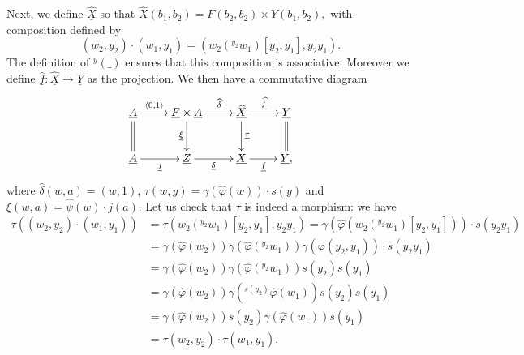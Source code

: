 \documentclass[11pt]{amsart}
\theoremstyle{plain}
\theoremstyle{definition}
\theoremstyle{remark}
\newcommand{\un}{\underline}
\begin{document}
Next, we define $\un{\widehat{X}}$ so that $\widehat{X}(b_1,b_2)=F(b_2, b_2) \times Y(b_1,b_2),$ with composition defined by
\[(w_2,y_2)\cdot (w_1,y_1) = (w_2({}^{y_2} w_1)[y_2,y_1] , y_2y_1). \]
The definition of ${}^y (\_ )$ ensures that this composition is associative. Moreover we define $\un{\widehat{f}}\colon \un{\widehat{X}} \to \un{Y}$ as the projection. We then have a commutative diagram
\begin{equation} \label{first part zigzag}
\xymatrix{ \un{A} \ar@{=}[d] \ar[r]^-{\langle 0, 1 \rangle} & \un{F} \times \un{A} \ar[d]_{\un{\xi}} \ar[r]^-{\un{\widehat{\delta}}} & \un{\widehat{X}} \ar[d]^{\un{\tau}} \ar[r]^{\un{\widehat{f}}} & \un{Y} \ar@{=}[d] \\
{\un{A}} \ar[r]_{\un{j}} &{\un{Z}} \ar[r]_-{\un{\delta}} &{\un{X}} \ar[r]_-{\un{f}} &{\un{Y},} }
\end{equation}
where $\widehat{\delta}(w,a) = (w,1)$, $\tau(w,y) = \gamma(\widehat{\varphi}(w))\cdot s(y)$ and $\xi (w,a) = \widehat{\psi}(w)\cdot j(a)$. Let us check that $\un{\tau}$ is indeed a morphism: we have
\begin{align*}
	\tau((w_2,y_2)\cdot (w_1,y_1)) & = \tau(w_2({}^{y_2} w_1)[y_2,y_1] , y_2y_1) = \gamma(\widehat{\varphi} (w_2({}^{y_2} w_1)[y_2,y_1]))\cdot s(y_2y_1)\\
	& = \gamma(\widehat{\varphi}(w_2)) \gamma(\widehat{\varphi}({}^{y_2} w_1)) \gamma(\varphi(y_2,y_1))\cdot s(y_2y_1)\\
	& = \gamma(\widehat{\varphi}(w_2))  \gamma(\widehat{\varphi}({}^{y_2} w_1)) s(y_2) s(y_1) \\
	& = \gamma(\widehat{\varphi}(w_2))  \gamma({}^{s(y_2)}\widehat{\varphi}( w_1)) s(y_2) s(y_1) \\
	& = \gamma(\widehat{\varphi}(w_2)) s(y_2) \gamma(\widehat{\varphi}( w_1)) s(y_1)\\
	& = \tau(w_2,y_2)\cdot \tau(w_1,y_1).
\end{align*}
\end{document}
